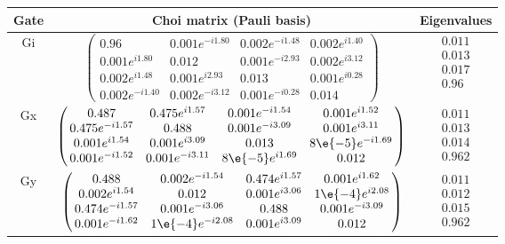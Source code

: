 {\begin{table}[h]
\begin{center}
\begin{tabular}[l]{|c|c|c|}
\hline
Gate & Choi matrix (Pauli basis) & Eigenvalues \\ \hline
Gi & $ \left(\!\!\begin{array}{cccc}
0.96 & 0.001e^{-i1.80} & 0.002e^{-i1.48} & 0.002e^{i1.40} \\ 
0.001e^{i1.80} & 0.012 & 0.001e^{-i2.93} & 0.002e^{i3.12} \\ 
0.002e^{i1.48} & 0.001e^{i2.93} & 0.013 & 0.001e^{i0.28} \\ 
0.002e^{-i1.40} & 0.002e^{-i3.12} & 0.001e^{-i0.28} & 0.014
 \end{array}\!\!\right) $
 & $ \begin{array}{c}
0.011 \\ 
0.013 \\ 
0.017 \\ 
0.96
 \end{array} $
 \\ \hline
Gx & $ \left(\!\!\begin{array}{cccc}
0.487 & 0.475e^{i1.57} & 0.001e^{-i1.54} & 0.001e^{i1.52} \\ 
0.475e^{-i1.57} & 0.488 & 0.001e^{-i3.09} & 0.001e^{i3.11} \\ 
0.001e^{i1.54} & 0.001e^{i3.09} & 0.013 & 8\e{-5}e^{-i1.69} \\ 
0.001e^{-i1.52} & 0.001e^{-i3.11} & 8\e{-5}e^{i1.69} & 0.012
 \end{array}\!\!\right) $
 & $ \begin{array}{c}
0.011 \\ 
0.013 \\ 
0.014 \\ 
0.962
 \end{array} $
 \\ \hline
Gy & $ \left(\!\!\begin{array}{cccc}
0.488 & 0.002e^{-i1.54} & 0.474e^{i1.57} & 0.001e^{i1.62} \\ 
0.002e^{i1.54} & 0.012 & 0.001e^{i3.06} & 1\e{-4}e^{i2.08} \\ 
0.474e^{-i1.57} & 0.001e^{-i3.06} & 0.488 & 0.001e^{-i3.09} \\ 
0.001e^{-i1.62} & 1\e{-4}e^{-i2.08} & 0.001e^{i3.09} & 0.012
 \end{array}\!\!\right) $
 & $ \begin{array}{c}
0.011 \\ 
0.012 \\ 
0.015 \\ 
0.962
 \end{array} $
 \\ \hline
\end{tabular}


\end{center}
\end{table}}
